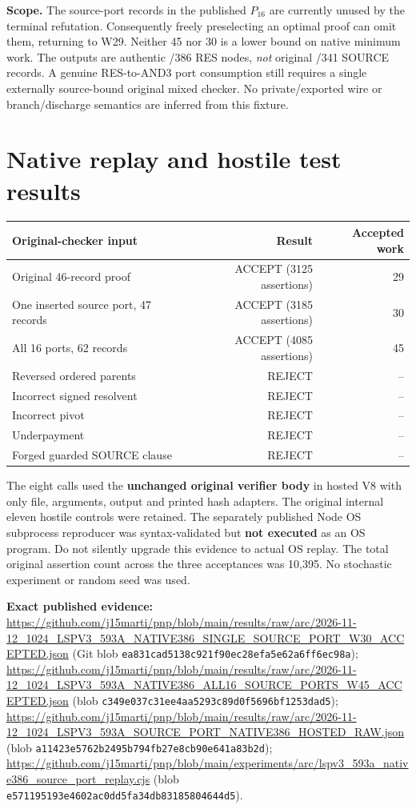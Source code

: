 \documentclass[11pt]{article}
\begin{document}
\noindent\textbf{Scope.} The source-port records in the published
$P_{16}$ are currently unused by the terminal refutation.
Consequently freely preselecting an optimal proof can omit them,
returning to W29. Neither 45 nor 30 is a lower bound on native
minimum work. The outputs are authentic /386 RES nodes, \emph{not}
original /341 SOURCE records. A genuine RES-to-AND3 port consumption
still requires a single externally source-bound original mixed
checker. No private/exported wire or branch/discharge semantics
are inferred from this fixture.

\section*{Native replay and hostile test results}
\begin{center}\begin{tabular}{lrr}
\toprule
Original-checker input & Result & Accepted work \\
\midrule
Original 46-record proof & ACCEPT (3125 assertions) & 29\\
One inserted source port, 47 records & ACCEPT (3185 assertions) & 30\\
All 16 ports, 62 records & ACCEPT (4085 assertions) & 45\\
Reversed ordered parents & REJECT & --\\
Incorrect signed resolvent & REJECT & --\\
Incorrect pivot & REJECT & --\\
Underpayment & REJECT & --\\
Forged guarded SOURCE clause & REJECT & --\\
\bottomrule
\end{tabular}\end{center}

The eight calls used the \textbf{unchanged original verifier body}
in hosted V8 with only file, arguments, output and printed hash
adapters. The original internal eleven hostile controls were
retained. The separately published Node OS subprocess reproducer
was syntax-validated but \textbf{not executed} as an OS program.
Do not silently upgrade this evidence to actual OS replay.
The total original assertion count across the three acceptances
was 10,395. No stochastic experiment or random seed was used.

\noindent\textbf{Exact published evidence:}
\url{https://github.com/j15marti/pnp/blob/main/results/raw/arc/2026-11-12_1024_LSPV3_593A_NATIVE386_SINGLE_SOURCE_PORT_W30_ACCEPTED.json}
(Git blob \texttt{ea831cad5138c921f90ec28efa5e62a6ff6ec98a});
\url{https://github.com/j15marti/pnp/blob/main/results/raw/arc/2026-11-12_1024_LSPV3_593A_NATIVE386_ALL16_SOURCE_PORTS_W45_ACCEPTED.json}
(blob \texttt{c349e037c31ee4aa5293c89d0f5696bf1253dad5});
\url{https://github.com/j15marti/pnp/blob/main/results/raw/arc/2026-11-12_1024_LSPV3_593A_SOURCE_PORT_NATIVE386_HOSTED_RAW.json}
(blob \texttt{a11423e5762b2495b794fb27e8cb90e641a83b2d});
\url{https://github.com/j15marti/pnp/blob/main/experiments/arc/lspv3_593a_native386_source_port_replay.cjs}
(blob \texttt{e571195193e4602ac0dd5fa34db83185804644d5}).
\end{document}
